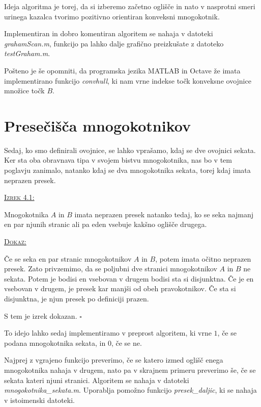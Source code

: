 \documentclass[a4paper, 12pt]{article} %
\newenvironment{matematika}[1]{
{\underline{\textsc{#1:}}}
}{
}
\begin{document}
Ideja algoritma je torej, da si izberemo začetno oglišče in nato v nasprotni smeri urinega kazalca tvorimo pozitivno orientiran konveksni mnogokotnik.

Implementiran in dobro komentiran algoritem se nahaja v datoteki \emph{grahamScan.m}, funkcijo pa lahko dalje grafično preizkušate z datoteko \emph{testGraham.m}.

Pošteno je še opomniti, da programska jezika MATLAB in Octave že imata implementirano funkcijo \emph{convhull}, ki nam vrne indekse točk konveksne ovojnice množice točk $B$.

\section{Presečišča mnogokotnikov}

Sedaj, ko smo definirali ovojnice, se lahko vprašamo, kdaj se dve ovojnici sekata. Ker sta oba obravnava tipa v svojem bistvu mnogokotnika, nas bo v tem poglavju zanimalo, natanko kdaj se dva mnogokotnika sekata, torej kdaj imata neprazen presek.

\begin{matematika}{Izrek 4.1}
Mnogokotnika $A$ in $B$ imata neprazen presek natanko tedaj, ko se seka najmanj en par njunih stranic ali pa eden vsebuje kakšno oglišče drugega.
\end{matematika}

\begin{matematika}{Dokaz}
Če se seka en par stranic mnogokotnikov $A$ in $B$, potem imata očitno neprazen presek.
Zato privzemimo, da se poljubni dve stranici mnogokotnikov $A$ in $B$ ne sekata. Potem je bodisi en vsebovan v drugem bodisi sta si disjunktna. Če je en vsebovan v drugem, je presek kar manjši od obeh pravokotnikov. Če sta si disjunktna, je njun presek po definiciji prazen.

S tem je izrek dokazan.\hspace*{\fill} $\square$
\end{matematika}

To idejo lahko sedaj implementiramo v preprost algoritem, ki vrne $1$, če se podana mnogokotnika sekata, in $0$, če se ne.

Najprej z vgrajeno funkcijo preverimo, če se katero izmed oglišč enega mnogokotnika nahaja v drugem, nato pa v skrajnem primeru preverimo še, če se sekata kateri njuni stranici. Algoritem se nahaja v datoteki \emph{mnogokotnika\_sekata.m}. Uporablja pomožno funkcijo \emph{presek\_daljic}, ki se nahaja v istoimenski datoteki.
\end{document}
